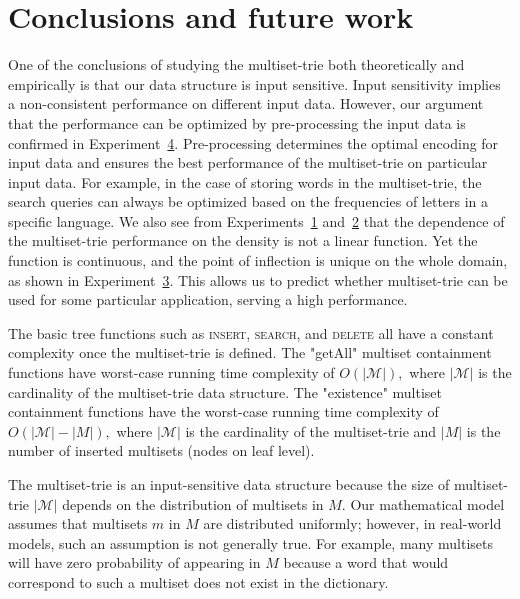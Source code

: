 \section{Conclusions and future work} \label{c:conclusions}

%
One of the conclusions of studying the multiset-trie both theoretically and empirically is that our data structure is input sensitive. Input sensitivity implies a non-consistent performance on different input data. However, our argument that the performance can be optimized by pre-processing the input data is confirmed in  Experiment~\hyperref[ss:exp3]{4}. Pre-processing determines the optimal encoding for input data and ensures the best performance of the multiset-trie on particular input data. For example, in the case of storing words in the multiset-trie, the search queries can always be optimized based on the frequencies of letters in a specific language. We also see from Experiments~\hyperref[s:exp1]{1} and~\hyperref[s:exp2]{2} that the dependence of the multiset-trie performance on the density is not a linear function. Yet the function is continuous, and the point of inflection is unique on the whole domain, as shown in Experiment~\hyperref[s:exp3]{3}. This allows us to predict whether multiset-trie can be used for some particular application, serving a high performance. 

%
The basic tree functions such as \textsc{insert}, \textsc{search}, and \textsc{delete} all have a constant complexity once the multiset-trie is defined. The "getAll" multiset containment functions have worst-case running time complexity of $O(|\mathcal{M}|),$ where $|\mathcal{M}|$ is the cardinality of the multiset-trie data structure. The "existence" multiset containment functions have the worst-case running time complexity of $O(|\mathcal{M}| - |M|),$ where $|\mathcal{M}|$ is the cardinality of the multiset-trie and $|M|$ is the number of inserted multisets (nodes on leaf level). 

The multiset-trie is an input-sensitive data structure because the size of multiset-trie $|\mathcal{M}|$ depends on the distribution of multisets in $M.$
Our mathematical model assumes that multisets $m$ in $M$ are distributed uniformly;  however, in real-world models, such an assumption is not generally true. 
For example, many multisets will have zero probability of appearing in $M$ because a word that would correspond to such a multiset does not exist in the dictionary.%

